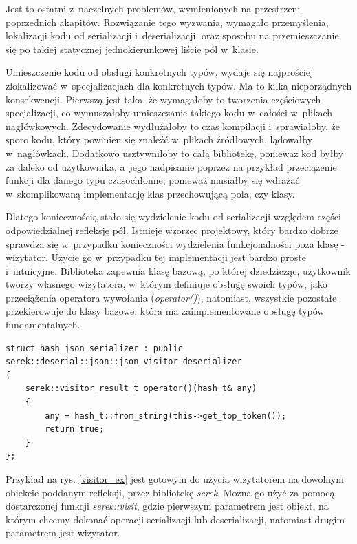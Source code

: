 \documentclass[12pt]{article}
\newcommand{\n}{\newline}
\newcommand{\nonpl}[1]{{\it #1}}
\newcommand{\code}[1]{{\it #1}}
\newcommand{\serek}{\nonpl{serek}}
\begin{document}
{{{				Jest to ostatni z~naczelnych problemów, wymienionych na przestrzeni poprzednich akapitów. Rozwiązanie tego wyzwania,
				wymagało przemyślenia, lokalizacji kodu od serializacji i~deserializacji, oraz sposobu na przemieszczanie się po takiej
				statycznej jednokierunkowej liście pól w~klasie.\n

				Umieszczenie kodu od obsługi konkretnych typów, wydaje się najprościej zlokalizować w~specjalizacjach dla konkretnych typów.
				Ma to kilka nieporządnych konsekwencji. Pierwszą jest taka, że wymagałoby to tworzenia częściowych specjalizacji, co
				wymuszałoby umieszczanie takiego kodu w~całości w~plikach nagłówkowych. Zdecydowanie wydłużałoby to czas kompilacji
				i~sprawiałoby, że sporo kodu, który powinien się znaleźć w~plikach źródłowych, lądowałby w~nagłówkach. Dodatkowo
				usztywniłoby to całą bibliotekę, ponieważ kod byłby za daleko od użytkownika, a~jego nadpisanie poprzez na przykład
				przeciążenie funkcji dla danego typu czasochłonne, ponieważ musiałby się wdrażać w~skomplikowaną implementację klas
				przechowującą pola, czy klasy.\n

				Dlatego koniecznością stało się wydzielenie kodu od serializacji względem części odpowiedzialnej refleksję pól. Istnieje wzorzec projektowy,
				który bardzo dobrze sprawdza się w~przypadku konieczności wydzielenia funkcjonalności poza klasę - wizytator\cite{visitor_description}.
				Użycie go w~przypadku tej implementacji jest bardzo proste i~intuicyjne. Biblioteka zapewnia klasę bazową, po której dziedzicząc,
				użytkownik tworzy własnego wizytatora, w~którym definiuje obsługę swoich typów, jako przeciążenia operatora wywołania (\code{operator()}),
				natomiast, wszystkie pozostałe przekierowuje do klasy bazowe, która ma zaimplementowane obsługę typów fundamentalnych.\n

				\begin{captioned}[H]
					\begin{lstlisting}[frame=single]
struct hash_json_serializer : public serek::deserial::json::json_visitor_deserializer
{
	serek::visitor_result_t operator()(hash_t& any)
	{
		any = hash_t::from_string(this->get_top_token());
		return true;
	}
};
					\end{lstlisting}
					\caption{ Przykład implementacji wizytatora, spełniającego wymagania biblioteki \serek, wraz z~zdefiniowaną obsługą własnego typu \code{hash\_t}.}
					\label{visitor_ex}
				\end{captioned}

				Przykład na rys. \ref{visitor_ex} jest gotowym do użycia wizytatorem na dowolnym obiekcie poddanym refleksji, przez bibliotekę
				\serek. Można go użyć za pomocą dostarczonej funkcji \code{serek::visit}, gdzie pierwszym parametrem jest obiekt, na którym
				chcemy dokonać operacji serializacji lub deserializacji, natomiast drugim parametrem jest wizytator.
			}
		}

}
\end{document}
